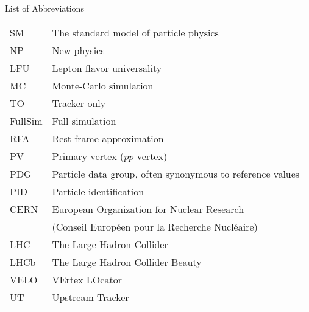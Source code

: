 \singlespacing \normalsize
\hbox{\ }

\vspace{.5in}

\begin{center}
\large{List of Abbreviations}
\end{center}

\vspace{3pt}

\begin{supertabular}{ll}
    SM      & The standard model of particle physics \\
    NP      & New physics \\
    LFU     & Lepton flavor universality \\
    MC      & Monte-Carlo simulation \\
    TO      & Tracker-only \\
    FullSim & Full simulation \\
    RFA     & Rest frame approximation \\
    PV      & Primary vertex ($pp$ vertex) \\
    PDG     & Particle data group, often synonymous to reference values \\
    PID     & Particle identification \\
    CERN    & European Organization for Nuclear Research \\
            & (Conseil Européen pour la Recherche Nucléaire) \\
    LHC     & The Large Hadron Collider \\
    LHCb    & The Large Hadron Collider Beauty \\
    VELO    & VErtex LOcator \\
    UT      & Upstream Tracker \\
\end{supertabular}
